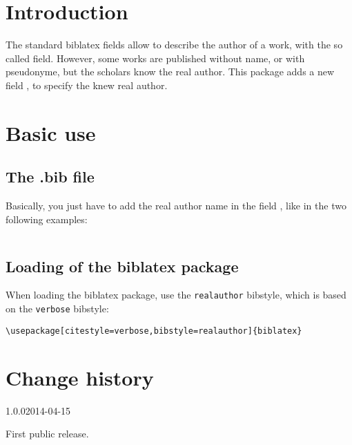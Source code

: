 \documentclass{ltxdockit}[2011/03/25]
\newcommand{\biblatex}{biblatex\xspace}
\newcommand{\namebibstyle}[1]{\texttt{#1}}
\begin{document}
\printtitlepage
\tableofcontents
\section{Introduction}

The standard biblatex fields allow to describe the author of a work, with the so called  field. However, some works are published without name, or with pseudonyme, but the scholars know the real author. This package adds a new field , to specify the knew real author.

\section{Basic use}

\subsection{The .bib file}
Basically, you just have to add the real author name in the field , like in the two following examples: 

\inputminted{tex}{example.bib}

\subsection{Loading of the \biblatex package}

When loading the \biblatex package, use the \namebibstyle{realauthor}  bibstyle, which is based on the \namebibstyle{verbose} bibstyle:

\begin{verbatim}
\usepackage[citestyle=verbose,bibstyle=realauthor]{biblatex}
\end{verbatim}

\section{Change history}

\begin{changelog}



\begin{release}{1.0.0}{2014-04-15}
\item First public release.
\end{release}
\end{changelog}
\end{document}

